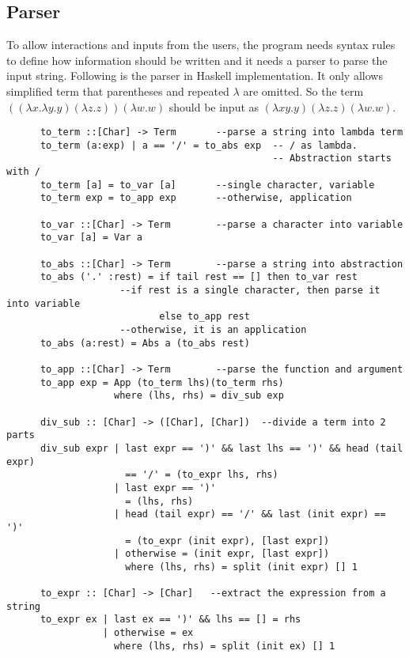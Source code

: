 \subsection{Parser}

To allow interactions and inputs from the users, the program needs syntax rules to define how information should be written and it needs a parser to parse the input string. Following is the parser in Haskell implementation. It only allows simplified term that parentheses and repeated $\lambda$ are omitted. So the term $((\lambda x.\lambda y.y)(\lambda z.z))(\lambda w.w)$ should be input as $(\lambda xy.y)(\lambda z.z)(\lambda w.w)$.  

\begin{verbatim}
      to_term ::[Char] -> Term       --parse a string into lambda term
      to_term (a:exp) | a == '/' = to_abs exp  -- / as lambda. 
                                               -- Abstraction starts with /
      to_term [a] = to_var [a]       --single character, variable   
      to_term exp = to_app exp       --otherwise, application

      to_var ::[Char] -> Term        --parse a character into variable
      to_var [a] = Var a

      to_abs ::[Char] -> Term        --parse a string into abstraction
      to_abs ('.' :rest) = if tail rest == [] then to_var rest 
                    --if rest is a single character, then parse it into variable
                           else to_app rest
                    --otherwise, it is an application
      to_abs (a:rest) = Abs a (to_abs rest)
        
      to_app ::[Char] -> Term        --parse the function and argument       
      to_app exp = App (to_term lhs)(to_term rhs) 
                   where (lhs, rhs) = div_sub exp

      div_sub :: [Char] -> ([Char], [Char])  --divide a term into 2 parts
      div_sub expr | last expr == ')' && last lhs == ')' && head (tail expr) 
                     == '/' = (to_expr lhs, rhs)  
                   | last expr == ')'       
                     = (lhs, rhs)
                   | head (tail expr) == '/' && last (init expr) == ')' 
                     = (to_expr (init expr), [last expr])
                   | otherwise = (init expr, [last expr])   
                     where (lhs, rhs) = split (init expr) [] 1

      to_expr :: [Char] -> [Char]   --extract the expression from a string
      to_expr ex | last ex == ')' && lhs == [] = rhs
                 | otherwise = ex
                   where (lhs, rhs) = split (init ex) [] 1


\end{verbatim}
